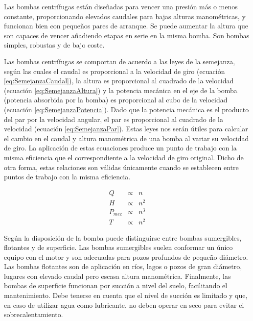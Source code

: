 Las bombas centrífugas están diseñadas para vencer una presión más
o menos constante, proporcionando elevados caudales para bajas alturas
manométricas, y funcionan bien con pequeños pares de arranque. Se
puede aumentar la altura que son capaces de vencer añadiendo etapas
en serie en la misma bomba. Son bombas simples, robustas y de bajo
coste.

Las bombas centrífugas se comportan de acuerdo a las leyes de la semejanza,
según las cuales el caudal es proporcional a la velocidad de giro
(ecuación \ref{eq:SemejanzaCaudal}), la altura es proporcional al
cuadrado de la velocidad (ecuación \ref{eq:SemejanzaAltura}) y la
potencia mecánica en el eje de la bomba (potencia absorbida por la
bomba) es proporcional al cubo de la velocidad (ecuación \ref{eq:SemejanzaPotencia}).
Dado que la potencia mecánica es el producto del par por la velocidad
angular, el par es proporcional al cuadrado de la velocidad (ecuación
\ref{eq:SemejanzaPar}). Estas leyes nos serán útiles para calcular
el cambio en el caudal y altura manométrica de una bomba al variar
su velocidad de giro. La aplicación de estas ecuaciones produce un
punto de trabajo con la misma eficiencia que el correspondiente a
la velocidad de giro original. Dicho de otra forma, estas relaciones
son válidas únicamente cuando se establecen entre puntos de trabajo
con la misma eficiencia.

\begin{center}
\begin{eqnarray}
Q & \propto & n\label{eq:SemejanzaCaudal}\\
H & \propto & n^{2}\label{eq:SemejanzaAltura}\\
P_{mec} & \propto & n^{3}\label{eq:SemejanzaPotencia}\\
T & \propto & n^{2}\label{eq:SemejanzaPar}\end{eqnarray}

\par\end{center}

Según la disposición de la bomba puede distinguirse entre bombas sumergibles,
flotantes y de superficie. Las bombas sumergibles suelen conformar
un único equipo con el motor y son adecuadas para pozos profundos
de pequeño diámetro. Las bombas flotantes son de aplicación en ríos,
lagos o pozos de gran diámetro, lugares con elevado caudal pero escasa
altura manométrica. Finalmente, las bombas de superficie funcionan
por succión a nivel del suelo, facilitando el mantenimiento. Debe
tenerse en cuenta que el nivel de succión es limitado y que, en caso
de utilizar agua como lubricante, no deben operar en seco para evitar
el sobrecalentamiento.



